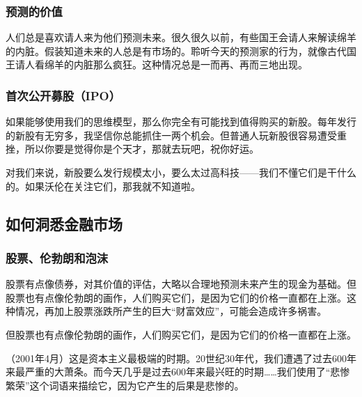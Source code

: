 \subsubsection*{预测的价值}

人们总是喜欢请人来为他们预测未来。很久很久以前，有些国王会请人来解读绵羊的内脏。假装知道未来的人总是有市场的。聆听今天的预测家的行为，就像古代国王请人看绵羊的内脏那么疯狂。这种情况总是一而再、再而三地出现。
\par

\subsubsection*{首次公开募股（IPO）}

如果能够使用我们的思维模型，那么你完全有可能找到值得购买的新股。每年发行的新股有无穷多，我坚信你总能抓住一两个机会。但普通人玩新股很容易遭受重挫，所以你要是觉得你是个天才，那就去玩吧，祝你好运。
\par

对我们来说，新股要么发行规模太小，要么太过高科技——我们不懂它们是干什么的。如果沃伦在关注它们，那我就不知道啦。
\par

\subsection*{如何洞悉金融市场}

\subsubsection*{股票、伦勃朗和泡沫}

股票有点像债券，对其价值的评估，大略以合理地预测未来产生的现金为基础。但股票也有点像伦勃朗的画作，人们购买它们，是因为它们的价格一直都在上涨。这种情况，再加上股票涨跌所产生的巨大“财富效应”，可能会造成许多祸害。
\par

\begin{WisdomBox}
\par

但股票也有点像伦勃朗的画作，人们购买它们，是因为它们的价格一直都在上涨。
\par
\end{WisdomBox}

（2001年4月）这是资本主义最极端的时期。20世纪30年代，我们遭遇了过去600年来最严重的大萧条。而今天几乎是过去600年来最兴旺的时期……我们使用了“悲惨繁荣”这个词语来描绘它，因为它产生的后果是悲惨的。
\par

